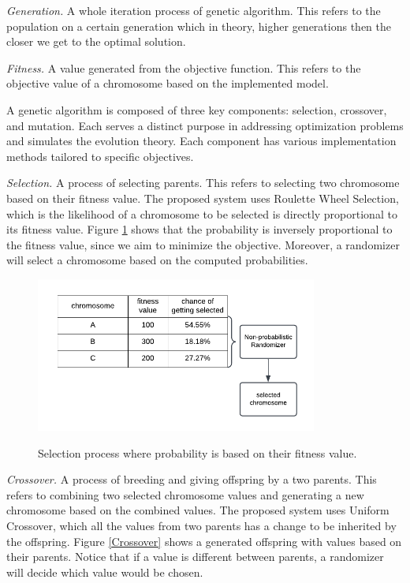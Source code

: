	\textit{Generation.} A whole iteration process of genetic algorithm. This refers to the population on a certain generation which in theory, higher generations then the closer we get to the optimal solution.
	
	\textit{Fitness.} A value generated from the objective function. This refers to the objective value of a chromosome based on the implemented model.
	
	A genetic algorithm is composed of three key components: selection, crossover, and mutation. Each serves a distinct purpose in addressing optimization problems and simulates the evolution theory. Each component has various implementation methods tailored to specific objectives. \parencite{Eyal2020}
	
	\textit{Selection.} A process of selecting parents. This refers to selecting two chromosome based on their fitness value. The proposed system uses Roulette Wheel Selection, which is the likelihood of a chromosome to be selected is directly proportional to its fitness value. Figure \ref{Selection} shows that the probability is inversely proportional to the fitness value, since we aim to minimize the objective. Moreover, a randomizer will select a chromosome based on the computed probabilities.
	
	\begin{figure}[h!]
		\caption{Selection process where probability is based on their fitness value.}
		\centering
		\includegraphics[width=350px]{Selection}
		\label{Selection}
	\end{figure}
	
	\textit{Crossover.} A process of breeding and giving offspring by a two parents. This refers to combining two selected chromosome values and generating a new chromosome based on the combined values. The proposed system uses Uniform Crossover, which all the values from two parents has a change to be inherited by the offspring. Figure \ref{Crossover} shows a generated offspring with values based on their parents. Notice that if a value is different between parents, a randomizer will decide which value would be chosen.
	
